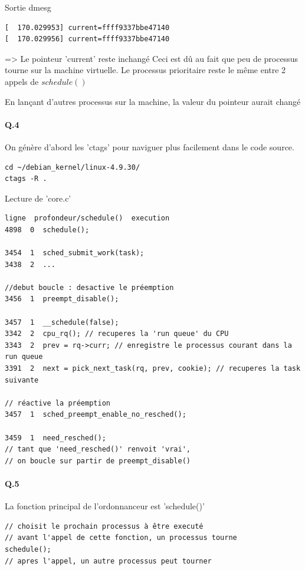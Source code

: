 \documentclass[10pt]{article}
\begin{document}
Sortie dmesg
\begin{lstlisting}[frame=single]
[  170.029953] current=ffff9337bbe47140
[  170.029956] current=ffff9337bbe47140
\end{lstlisting}

=> Le pointeur 'current' reste inchangé
Ceci est dû au fait que peu de processus tourne sur la machine virtuelle.
Le processus prioritaire reste le même entre 2 appels de $schedule()$

En lançant d'autres processus sur la machine, la valeur du pointeur aurait changé


\paragraph{Q.4}
On génère d'abord les 'ctags' pour naviguer plus facilement dans le code source.

\lstset{language=bash}
\begin{lstlisting}[frame=single]
cd ~/debian_kernel/linux-4.9.30/
ctags -R .
\end{lstlisting}


Lecture de 'core.c'
\lstset{language=C}
\begin{lstlisting}[frame=single]
ligne  profondeur/schedule()  execution
4898  0  schedule();

3454  1  sched_submit_work(task);
3438  2  ...

//debut boucle : desactive le préemption
3456  1  preempt_disable();

3457  1  __schedule(false);
3342  2  cpu_rq(); // recuperes la 'run queue' du CPU
3343  2  prev = rq->curr; // enregistre le processus courant dans la run queue
3391  2  next = pick_next_task(rq, prev, cookie); // recuperes la task suivante

// réactive la préemption
3457  1  sched_preempt_enable_no_resched();

3459  1  need_resched();
// tant que 'need_resched()' renvoit 'vrai',
// on boucle sur partir de preempt_disable()
\end{lstlisting}
        
\paragraph{Q.5} La fonction principal de l'ordonnanceur est 'schedule()'

\lstset{language=C}
\begin{lstlisting}[frame=single]
// choisit le prochain processus à être executé
// avant l'appel de cette fonction, un processus tourne
schedule();
// apres l'appel, un autre processus peut tourner
\end{lstlisting}
        
\end{document}
